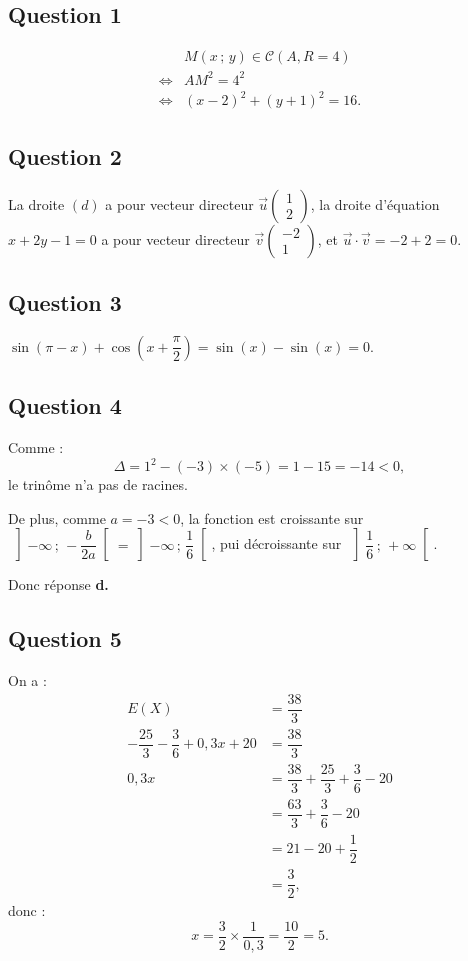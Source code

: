 \subsection*{Question 1}

\begin{align*}
&M(x\,;\,y) \in \mathcal{C} (A, R = 4) \\
\iff &AM^2 = 4^2 \\
\iff &(x - 2)^2 + (y + 1)^2 = 16.
\end{align*}

\subsection*{Question 2}

La droite \((d)\) a pour vecteur directeur \( \vec{u} \begin{pmatrix} 1 \\ 2 \end{pmatrix} \), la droite d'équation \( x + 2y - 1 = 0 \) a pour vecteur directeur \( \vec{v} \begin{pmatrix} -2 \\ 1 \end{pmatrix} \), et \(\vec{u} \cdot \vec{v} = -2 + 2 = 0\).

\subsection*{Question 3}

\(\sin(\pi - x) + \cos\left(x + \dfrac{\pi}{2}\right) = \sin(x) - \sin(x) = 0\).

\subsection*{Question 4}

Comme :
\[
\Delta = 1^2 - (-3) \times (-5) = 1 - 15 = -14 < 0,
\]
le trinôme n'a pas de racines.

De plus, comme \(a = -3 < 0\), la fonction est croissante sur \(\, \left] -\infty \,;\, -\dfrac{b}{2a} \right[ = \left] -\infty \,;\, \dfrac{1}{6} \right[\), pui décroissante sur \(\, \left] \dfrac{1}{6} \,;\, +\infty \right[\).

Donc réponse \textbf{d.}

\subsection*{Question 5}

On a :
\begin{align*}
E(X) &= \dfrac{38}{3} \\
-\dfrac{25}{3} - \dfrac{3}{6} + 0,3x + 20 &= \dfrac{38}{3} \\
0,3x &= \dfrac{38}{3} + \dfrac{25}{3} + \dfrac{3}{6} - 20 \\
&= \dfrac{63}{3} + \dfrac{3}{6} - 20 \\
&= 21 - 20 + \dfrac{1}{2} \\
&= \dfrac{3}{2},
\end{align*}
donc :
\[
x = \dfrac{3}{2} \times \dfrac{1}{0,3} = \dfrac{10}{2} = 5.
\]
